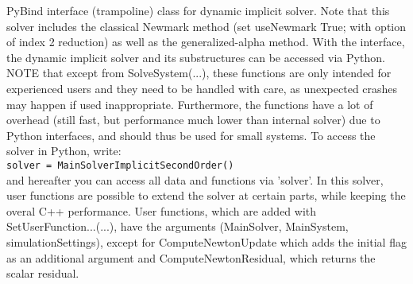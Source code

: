 \label{sec:MainSolverImplicitSecondOrder}
PyBind interface (trampoline) class for dynamic implicit solver. Note that this solver includes the classical Newmark method (set useNewmark True; with option of index 2 reduction) as well as the generalized-alpha method. With the interface, the dynamic implicit solver and its substructures can be accessed via Python. NOTE that except from SolveSystem(...), these functions are only intended for experienced users and they need to be handled with care, as unexpected crashes may happen if used inappropriate. Furthermore, the functions have a lot of overhead (still fast, but performance much lower than internal solver) due to Python interfaces, and should thus be used for small systems. To access the solver in Python, write: \\ 
 \texttt{solver = MainSolverImplicitSecondOrder()} \\ 
and hereafter you can access all data and functions via 'solver'.
 In this solver, user functions are possible to extend the solver at certain parts, while keeping the overal C++ performance. User functions, which are added with SetUserFunction...(...), have the arguments (MainSolver, MainSystem, simulationSettings), except for ComputeNewtonUpdate which adds the initial flag as an additional argument and ComputeNewtonResidual, which returns the scalar residual.

